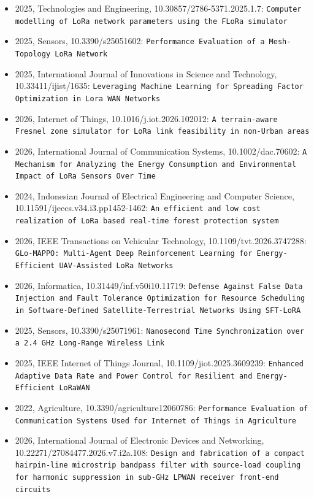 \begin{itemize}
\item 2025, Technologies and Engineering, 10.30857/2786-5371.2025.1.7: \texttt{Computer modelling of LoRa network parameters using the FLoRa simulator}
\item 2025, Sensors, 10.3390/s25051602: \texttt{Performance Evaluation of a Mesh-Topology LoRa Network}
\item 2025, International Journal of Innovations in Science and Technology, 10.33411/ijist/1635: \texttt{Leveraging Machine Learning for Spreading Factor Optimization in Lora WAN Networks}
\item 2026, Internet of Things, 10.1016/j.iot.2026.102012: \texttt{A terrain-aware Fresnel zone simulator for LoRa link feasibility in non-Urban areas}
\item 2026, International Journal of Communication Systems, 10.1002/dac.70602: \texttt{A Mechanism for Analyzing the Energy Consumption and Environmental Impact of LoRa Sensors Over Time}
\item 2024, Indonesian Journal of Electrical Engineering and Computer Science, 10.11591/ijeecs.v34.i3.pp1452-1462: \texttt{An efficient and low cost realization of LoRa based real-time forest protection system}
\item 2026, IEEE Transactions on Vehicular Technology, 10.1109/tvt.2026.3747288: \texttt{GLo-MAPPO: Multi-Agent Deep Reinforcement Learning for Energy-Efficient UAV-Assisted LoRa Networks}
\item 2026, Informatica, 10.31449/inf.v50i10.11719: \texttt{Defense Against False Data Injection and Fault Tolerance Optimization for Resource Scheduling in Software-Defined Satellite-Terrestrial Networks Using SFT-LoRA}
\item 2025, Sensors, 10.3390/s25071961: \texttt{Nanosecond Time Synchronization over a 2.4 GHz Long-Range Wireless Link}
\item 2025, IEEE Internet of Things Journal, 10.1109/jiot.2025.3609239: \texttt{Enhanced Adaptive Data Rate and Power Control for Resilient and Energy-Efficient LoRaWAN}
\item 2022, Agriculture, 10.3390/agriculture12060786: \texttt{Performance Evaluation of Communication Systems Used for Internet of Things in Agriculture}
\item 2026, International Journal of Electronic Devices and Networking, 10.22271/27084477.2026.v7.i2a.108: \texttt{Design and fabrication of a compact hairpin-line microstrip bandpass filter with source-load coupling for harmonic suppression in sub-GHz LPWAN receiver front-end circuits}

\end{itemize}
